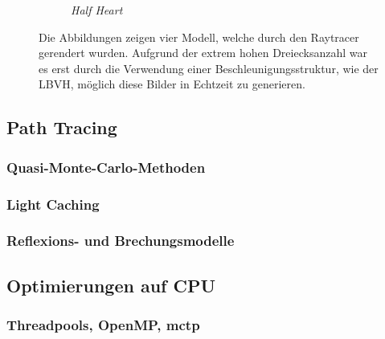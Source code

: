 \documentclass[crop=false]{standalone}
\begin{document}
\begin{figure}[h]
\begin{subfigure}[b]{0.24\textwidth}
          \caption{\textit{Half Heart}}
        \end{subfigure}
        \caption{%
          Die Abbildungen zeigen vier Modell, welche durch den Raytracer gerendert wurden.
          Aufgrund der extrem hohen Dreiecksanzahl war es erst durch die Verwendung einer Beschleunigungsstruktur, wie der LBVH, möglich diese Bilder in Echtzeit zu generieren.
        }
        \label{fig:lbvh-results}
      \end{figure}


    \subsection{Path Tracing} %
    \label{sub:path_tracing}
      \subsubsection{Quasi-Monte-Carlo-Methoden} %
      \label{ssub:monte_carlo_methoden}


      \subsubsection{Light Caching} %
      \label{ssub:light_caching}


      \subsubsection{Reflexions- und Brechungsmodelle} %
      \label{ssub:reflexions_und_brechungsmodelle}


    \subsection{Optimierungen auf CPU} %
    \label{sub:optimierungen_auf_cpu}
      \subsubsection{Threadpools, OpenMP, mctp} %
      \label{ssub:threadpools}
\end{document}

